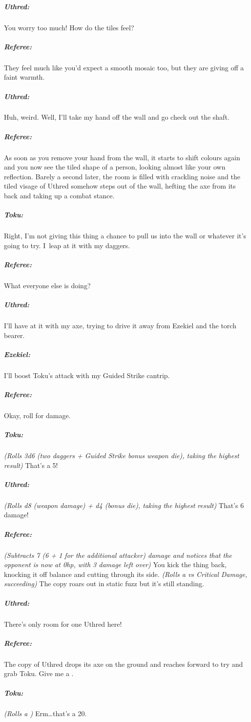 \documentclass[itdr/core]{subfiles}
\begin{document}
{\subparagraph{Uthred:} You worry too much! How do the tiles feel?

\subparagraph{Referee:} They feel much like you'd expect a smooth mosaic too, but they are giving off a faint warmth.

\subparagraph{Uthred:} Huh, weird. Well, I'll take my hand off the wall and go check out the shaft.

\vfill
\break

\subparagraph{Referee:} As soon as you remove your hand from the wall, it starts to shift colours again and you now see the tiled shape of a person, looking almost like your own reflection. Barely a second later, the room is filled with crackling noise and the tiled visage of Uthred somehow steps out of the wall, hefting the axe from its back and taking up a combat stance.

\subparagraph{Toku:} Right, I'm not giving this thing a chance to pull us into the wall or whatever it's going to try. I~leap at it with my daggers.

\subparagraph{Referee:} What everyone else is doing?

\subparagraph{Uthred:} I'll have at it with my axe, trying to drive it away from Ezekiel and the torch bearer.

\subparagraph{Ezekiel:} I'll boost Toku's attack with my Guided Strike cantrip.

\subparagraph{Referee:} Okay, roll for damage.

\subparagraph{Toku:} {\em (Rolls 3d6 (two daggers + Guided Strike bonus weapon die), taking the highest result)} That's a 5!

\subparagraph{Uthred:} {\em (Rolls d8 (weapon damage) + d4 (bonus die), taking the highest result)} That's 6 damage!

\subparagraph{Referee:} {\em (Subtracts 7 (6 + 1 for the additional attacker) damage and notices that the opponent is now at 0hp, with 3 damage left over)} You kick the thing back, knocking it off balance and cutting through its side. {\em (Rolls a  vs Critical Damage, succeeding)} The copy roars out in static fuzz but it's still standing.

\subparagraph{Uthred:} There's only room for one Uthred here!

\subparagraph{Referee:} The copy of Uthred drops its axe on the ground and reaches forward to try and grab Toku. Give me a .

\subparagraph{Toku:} {\em (Rolls a )} Erm\ldots that's a 20.

}
\end{document}
